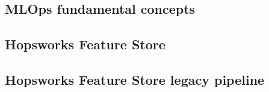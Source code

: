 
\subsection{MLOps fundamental concepts}

\subsection{Hopsworks Feature Store}

\subsection{Hopsworks Feature Store legacy pipeline}

